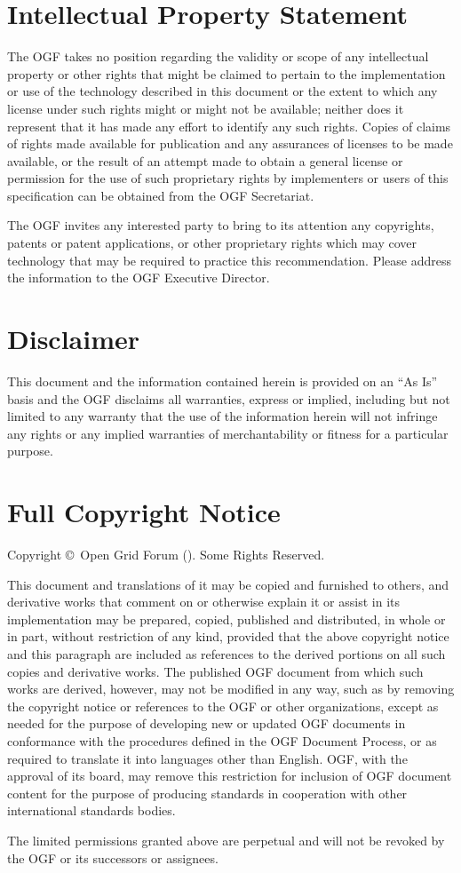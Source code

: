 
\section{Intellectual Property Statement}

The OGF takes no position regarding the validity or scope of any intellectual property or other rights that might be claimed to pertain to the implementation or use of the technology described in this document or the extent to which any license under such rights might or might not be available; neither does it represent that it has made any effort to identify any such rights.  Copies of claims of rights made available for publication and any assurances of licenses to be made available, or the result of an attempt made to obtain a general license or permission for the use of such proprietary rights by implementers or users of this specification can be obtained from the OGF Secretariat.

The OGF invites any interested party to bring to its attention any copyrights, patents or patent applications, or other proprietary rights which may cover technology that may be required to practice this recommendation.  Please address the information to the OGF Executive Director.

\section{Disclaimer}

This document and the information contained herein is provided on an ``As Is'' basis and the OGF disclaims all warranties, express or implied, including but not limited to any warranty that the use of the information herein will not infringe any rights or any implied warranties of merchantability or fitness for a particular purpose.

\section{Full Copyright Notice}

Copyright \copyright \ Open Grid Forum (\copyrightyears). Some Rights Reserved.

This document and translations of it may be copied and furnished to
others, and derivative works that comment on or otherwise explain it
or assist in its implementation may be prepared, copied, published and
distributed, in whole or in part, without restriction of any kind,
provided that the above copyright notice and this paragraph are
included as references to the derived portions on all such copies and
derivative works. The published OGF document from which such works are
derived, however, may not be modified in any way, such as by removing
the copyright notice or references to the OGF or other organizations,
except as needed for the purpose of developing new or updated OGF
documents in conformance with the procedures defined in the OGF
Document Process, or as required to translate it into languages other
than English. OGF, with the approval of its board, may remove this
restriction for inclusion of OGF document content for the purpose of
producing standards in cooperation with other international standards
bodies.

The limited permissions granted above are perpetual and will not be
revoked by the OGF or its successors or assignees.
